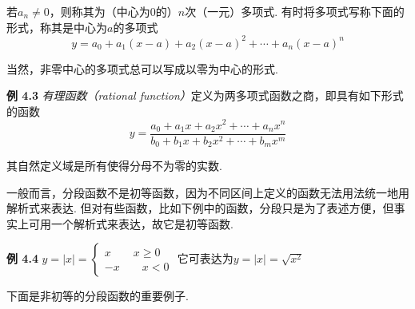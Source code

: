 \documentclass{article}
\begin{document}
若$a_{n}\neq 0$，则称其为（中心为$0$的）$n$次（一元）多项式. 有时将多项式写称下面的形式，称其是中心为$a$的多项式\[y=a_{0}+a_{1}(x-a)+a_{2}(x-a)^{2}+\cdots+a_{n}(x-a)^{n}\]

当然，非零中心的多项式总可以写成以零为中心的形式.

\vspace{3pt}

\textbf{例 4.3} \textit{有理函数（rational function）}定义为两多项式函数之商，即具有如下形式的函数\[y=\frac{a_{0}+a_{1}x+a_{2}x^{2}+\cdots+a_{n}x^{n}}{b_{0}+b_{1}x+b_{2}x^{2}+\cdots+b_{m}x^{m}}\]

其自然定义域是所有使得分母不为零的实数. 

\vspace{3pt}

一般而言，分段函数不是初等函数，因为不同区间上定义的函数无法用法统一地用解析式来表达. 但对有些函数，比如下例中的函数，分段只是为了表述方便，但事实上可用一个解析式来表达，故它是初等函数.


\vspace{3pt}

\textbf{例 4.4} $y=|x|=\left\{\begin{array}{c}
     x\qquad x\geq 0  \\
     -x\qquad x<0
\end{array}\right.$  它可表达为$y=|x|=\sqrt{x^{2}}$

\vspace{3pt}

下面是非初等的分段函数的重要例子.

\vspace{3pt}
\end{document}
